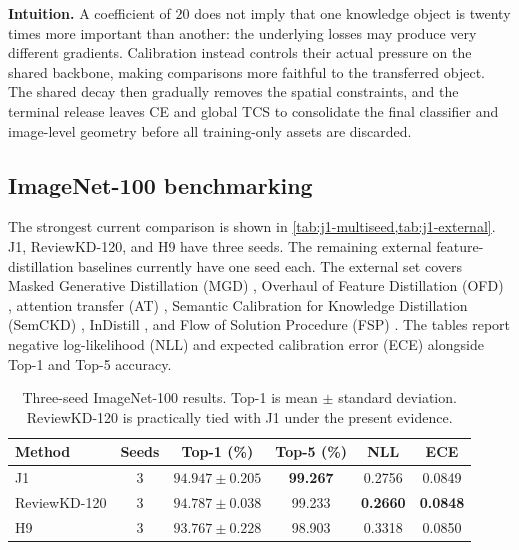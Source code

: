 \begin{center}
\end{center}

\textbf{Intuition.} A coefficient of $20$ does not imply that one knowledge
object is twenty times more important than another: the underlying losses may
produce very different gradients. Calibration instead controls their actual
pressure on the shared backbone, making comparisons more faithful to the
transferred object. The shared decay then gradually removes the spatial
constraints, and the terminal release leaves CE and global TCS to consolidate
the final classifier and image-level geometry before all training-only assets
are discarded.

\subsection{ImageNet-100 benchmarking}

The strongest current comparison is shown in
\cref{tab:j1-multiseed,tab:j1-external}. J1, ReviewKD-120, and H9 have three
seeds. The remaining external feature-distillation baselines currently have one
seed each. The external set covers Masked Generative Distillation (MGD)
\cite{yang2022mgd}, Overhaul of Feature Distillation (OFD)
\cite{heo2019ofd}, attention transfer (AT) \cite{zagoruyko2017attention},
Semantic Calibration for Knowledge Distillation (SemCKD)
\cite{chen2021semckd}, InDistill \cite{sarridis2025indistill}, and Flow of
Solution Procedure (FSP) \cite{yim2017fsp}. The tables report negative
log-likelihood (NLL) and expected calibration error (ECE) alongside Top-1 and
Top-5 accuracy.

\begin{table}[H]
\centering
\caption{Three-seed ImageNet-100 results. Top-1 is mean $\pm$ standard
deviation. ReviewKD-120 is practically tied with J1 under the present evidence.}
\label{tab:j1-multiseed}
\small
\begin{tabular}{lccccc}
\toprule
Method & Seeds & Top-1 (\%) & Top-5 (\%) & NLL & ECE\\
\midrule
J1           & 3 & \textbf{$94.947\pm0.205$} & \textbf{99.267} & 0.2756 & 0.0849\\
\midrule
ReviewKD-120 & 3 & $94.787\pm0.038$ & 99.233 & \textbf{0.2660} & \textbf{0.0848}\\
\midrule
H9           & 3 & $93.767\pm0.228$ & 98.903 & 0.3318 & 0.0850\\
\bottomrule
\end{tabular}
\end{table}

